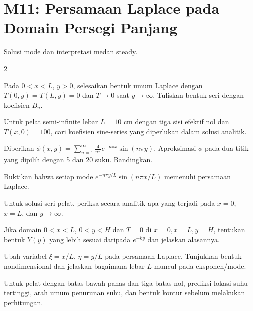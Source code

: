 \documentclass[10pt,a4paper]{article}
\newcommand{\level}[1]{\colorbox{levelbg}{\scriptsize\strut #1}}
\newcommand{\src}[1]{\colorbox{sourcebg}{\scriptsize\strut #1}}
\begin{document}
\section*{M11: Persamaan Laplace pada Domain Persegi Panjang}
{\color{iteraGray}\small Solusi mode dan interpretasi medan steady.}\par\vspace{1mm}
\begin{multicols}{2}
\begin{qbox}[title={M11.1: Pelat semi-infinite\hfill \level{L3}\;\src{Var}}]
\small Pada $0<x<L$, $y>0$, selesaikan bentuk umum Laplace dengan $T(0,y)=T(L,y)=0$ dan $T\to0$ saat $y\to\infty$. Tuliskan bentuk seri dengan koefisien $B_n$.
\end{qbox}
\begin{qbox}[title={M11.2: Batas bawah konstan\hfill \level{L3}\;\src{PR}}]
\small Untuk pelat semi-infinite lebar $L=10$ cm dengan tiga sisi efektif nol dan $T(x,0)=100$, cari koefisien sine-series yang diperlukan dalam solusi analitik.
\end{qbox}
\begin{qbox}[title={M11.3: Evaluasi solusi seri\hfill \level{L2}\;\src{PR}}]
\small Diberikan $\phi(x,y)=\sum_{n=1}^{\infty}\frac{4}{n\pi}e^{-n\pi x}\sin(n\pi y)$. Aproksimasi $\phi$ pada dua titik yang dipilih dengan 5 dan 20 suku. Bandingkan.
\end{qbox}
\begin{qbox}[title={M11.4: Verifikasi PDE\hfill \level{L3}\;\src{Var}}]
\small Buktikan bahwa setiap mode $e^{-n\pi y/L}\sin(n\pi x/L)$ memenuhi persamaan Laplace.
\end{qbox}
\begin{qbox}[title={M11.5: Verifikasi kondisi batas\hfill \level{L3}\;\src{Var}}]
\small Untuk solusi seri pelat, periksa secara analitik apa yang terjadi pada $x=0$, $x=L$, dan $y\to\infty$.
\end{qbox}
\begin{qbox}[title={M11.6: Pelat finite height\hfill \level{L4}\;\src{Var}}]
\small Jika domain $0<x<L$, $0<y<H$ dan $T=0$ di $x=0,x=L,y=H$, tentukan bentuk $Y(y)$ yang lebih sesuai daripada $e^{-ky}$ dan jelaskan alasannya.
\end{qbox}
\begin{qbox}[title={M11.7: Dimensi dan scaling\hfill \level{L3}\;\src{Var}}]
\small Ubah variabel $\xi=x/L$, $\eta=y/L$ pada persamaan Laplace. Tunjukkan bentuk nondimensional dan jelaskan bagaimana lebar $L$ muncul pada eksponen/mode.
\end{qbox}
\begin{qbox}[title={M11.8: Interpretasi fisik\hfill \level{L2}\;\src{Var}}]
\small Untuk pelat dengan batas bawah panas dan tiga batas nol, prediksi lokasi suhu tertinggi, arah umum penurunan suhu, dan bentuk kontur sebelum melakukan perhitungan.
\end{qbox}
\end{multicols}
\newpage
\end{document}
